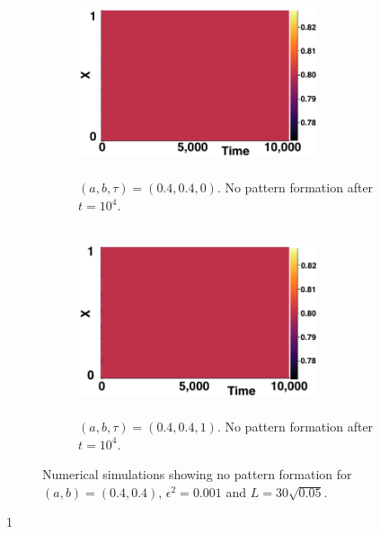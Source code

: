 \begin{figure}[H]
    \centering
    \begin{subfigure}[b]{0.45\textwidth}
        \centering
        \includegraphics[width=7cm,height = 5.5cm]{nopatt1.png}
        \caption{$(a,b,\tau)=(0.4,0.4,0)$. No pattern formation after $t=10^4$. }
        \label{}
    \end{subfigure}
    \hfill
    \begin{subfigure}[b]{0.45\textwidth}
        \centering
        \includegraphics[width=7cm,height = 5.5cm]{nopatt2.png}
        \caption{$(a,b,\tau)=(0.4,0.4,1)$. No pattern formation after $t=10^4$.}
        \label{}
    \end{subfigure}
    \caption{Numerical simulations showing no pattern formation for $(a,b)=(0.4,0.4)$, $\epsilon^2=0.001$ and $L=30\sqrt{0.05}$.}
    \label{fig:fixedsim1}
\end{figure}1

